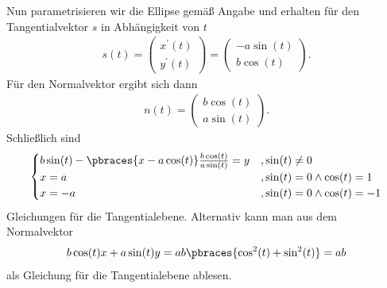 \begin{solution}
Nun parametrisieren wir die Ellipse gemäß Angabe und erhalten für den Tangentialvektor $s$ in Abhängigkeit von $t$
\begin{align*}
  s(t) = 
  \begin{pmatrix}
    x^\prime(t) \\ y^\prime(t)
  \end{pmatrix} =
  \begin{pmatrix}
    -a \sin(t) \\ b \cos(t)
  \end{pmatrix} .
\end{align*}
Für den Normalvektor ergibt sich dann 
\begin{align*}
  n(t) = 
  \begin{pmatrix}
    b \cos(t) \\ a \sin(t)
  \end{pmatrix} .
\end{align*}
Schließlich sind
\begin{align*}
  \begin{cases}
    b \sin(t) - \pbraces{ x - a \cos(t) } \frac{b \cos(t)}{a \sin(t)} = y & ,\sin(t) \neq 0 \\
    x = a & , \sin(t) = 0 \land \cos(t) = 1 \\
    x = -a & , \sin(t) = 0 \land \cos(t) = -1
  \end{cases}
\end{align*}
Gleichungen für die Tangentialebene. Alternativ kann man aus dem Normalvektor
\begin{align*}
  b \cos(t) x + a \sin(t) y = ab \pbraces{ \cos^2(t) + \sin^2(t) } = ab 
\end{align*}
  als Gleichung für die Tangentialebene ablesen.
\end{solution}
